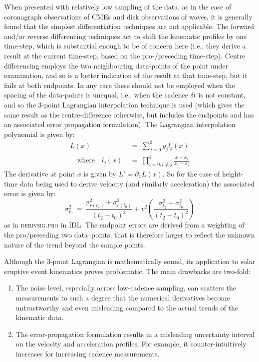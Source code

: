 \documentclass[structabstract]{aa}
\begin{document}
When presented with relatively low sampling of the data, as in the case of coronagraph observations of CMEs and disk observations of waves, it is generally found that the simplest differentiation techniques are not applicable. The forward and/or reverse differencing techniques act to shift the kinematic profiles by one time-step, which is substantial enough to be of concern here (i.e., they derive a result at the current time-step, based on the pro-/preceding time-step). Centre differencing employs the two neighbouring data-points of the point under examination, and so is a better indication of the result at that time-step, but it fails at both endpoints. In any case these should not be employed when the spacing of the data-points is unequal, i.e., when the cadence $\delta t$ is not constant, and so the 3-point Lagrangian interpolation technique is used (which gives the same result as the centre-difference otherwise, but includes the endpoints and has an associated error propagation formulation). The Lagrangian interpolation polynomial is given by:
\begin{eqnarray}
L(x) \; &=\; \sum_{j=0}^2 y_j l_j(x) \\ \quad \mbox{where} \quad
l_j(x) \; &=\; \prod_{i=0, i\neq j}^2 \frac{x-x_i}{x_j-x_i} 
\end{eqnarray}
The derivative at point $x$ is given by $L'=\partial_x L(x)$. So for the case of height-time data being used to derive velocity (and similarly acceleration) the associated error is given by:
\begin{equation}
\sigma_{v_1}^2 \,=\, \frac{\sigma_{r(t_2)}^2+\sigma_{r(t_0)}^2}{(t_2-t_0)^2} + v^2 \left( \frac{\sigma_{t_2}^2+\sigma_{t_0}^2}{(t_2-t_0)^2} \right)
\label{vel_err}
\end{equation}
as in \textsc{derivsig.pro} in IDL. The endpoint errors are derived from a weighting of the pro/preceding two data--points, that is therefore larger to reflect the unknown nature of the trend beyond the sample points.

Although the 3-point Lagrangian is mathematically sound, its application to solar eruptive event kinematics proves problematic. The main drawbacks are two-fold:
\begin{enumerate}
\item The noise level, especially across low-cadence sampling, can scatters the measurements to such a degree that the numerical derivatives become untrustworthy and even misleading compared to the actual trends of the kinematic data.
\item The error-propagation formulation results in a misleading uncertainty interval on the velocity and acceleration profiles. For example, it counter-intuitively increases for increasing cadence measurements.
\end{enumerate}
\end{document}
